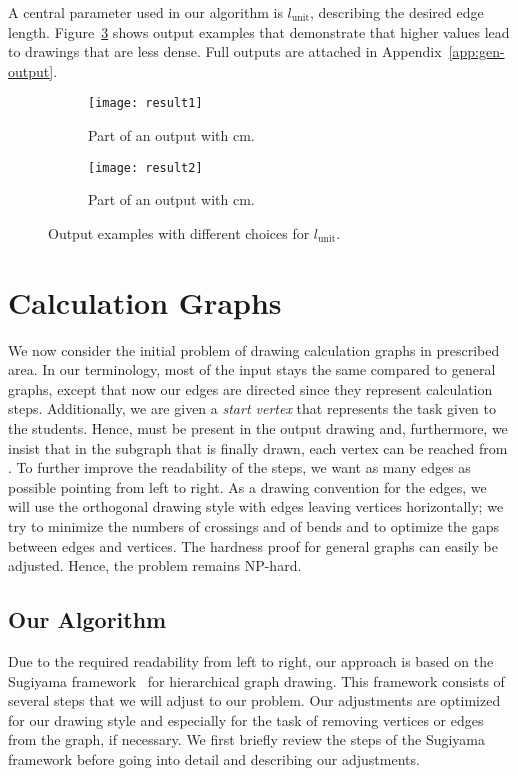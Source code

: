 \documentclass[]{llncs}
\newcommand{\lunit}{\ensuremath{l_\mathrm{unit}}\xspace}
\begin{document}
A central parameter used in our algorithm is \lunit, describing the
desired edge length. Figure~\ref{fig:gen-results-examples-crop} shows
output examples that demonstrate that higher values lead to
drawings that are less dense. Full outputs are attached in
Appendix~\ref{app:gen-output}.

\begin{figure}[tb]
  \begin{subfigure}[t]{.49\textwidth}
    \centering
    \texttt{[image: result1]}
    \caption{Part of an output with cm.}
    \label{fig:gen-result1-crop}
  \end{subfigure}
  \hfill
  \begin{subfigure}[t]{.49\textwidth}
    \centering
    \texttt{[image: result2]}
    \caption{Part of an output with cm.}
    \label{fig:gen-result2-crop}
  \end{subfigure}
  \caption{Output examples with different choices for \lunit.}
  \label{fig:gen-results-examples-crop}
\end{figure}

\section{Calculation Graphs}
\label{sec:calculation}

We now consider the initial problem of drawing calculation graphs in
prescribed area.
In our terminology, most of the input stays the same compared to
general graphs, except that now our edges are directed since they
represent calculation steps. Additionally, we are given a
\emph{start vertex}  that represents the task given to the
students. Hence,  must be present in the output drawing and,
furthermore, we insist that in the subgraph that is finally drawn,
each vertex can be reached from . To further improve the
readability of the steps, we want as many edges as possible pointing
from left to right. As a drawing convention for the edges, we will use
the orthogonal drawing style with edges leaving vertices horizontally;
we try to minimize the numbers of crossings and of bends and to
optimize the gaps between edges and vertices.
The hardness proof for general graphs can easily be adjusted. Hence,
the problem remains NP-hard.


\subsection{Our Algorithm}
Due to the required readability from left to right, our approach is
based on the Sugiyama framework~\cite{sugiyama1981methods} for
hierarchical graph drawing. This framework consists of several steps
that we will adjust to our problem.  Our adjustments are optimized for
our drawing style and especially for the task of removing vertices or
edges from the graph, if necessary. We first briefly review the steps
of the Sugiyama framework before going into detail and describing our
adjustments.
\end{document}

